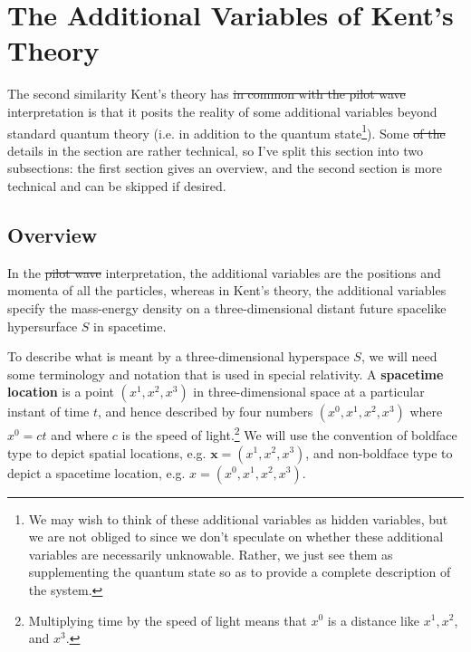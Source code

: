 \documentclass[12pt]{report}
\providecommand{\DIFadd}[1]{{\protect\color{blue}\uwave{#1}}} %
\providecommand{\DIFdel}[1]{{\protect\color{red}\sout{#1}}}                      %
\providecommand{\DIFaddbegin}{} %
\providecommand{\DIFaddend}{} %
\providecommand{\DIFdelbegin}{} %
\providecommand{\DIFdelend}{} %
\begin{document}

\section{The Additional Variables of Kent's Theory\label{additional}}
The second similarity Kent's theory has \DIFdelbegin \DIFdel{in common with the pilot wave }\DIFdelend \DIFaddbegin \DIFadd{with the Bohmian }\DIFaddend interpretation is that it posits the reality of some additional variables beyond standard quantum theory (i.e. in addition to the quantum state\footnote{We may wish to think of these additional variables as hidden variables, but we are not obliged to since we don't speculate on whether these additional variables are necessarily unknowable. Rather, we just see them as supplementing the quantum state so as to provide a complete description of the system.}). Some \DIFdelbegin \DIFdel{of the }\DIFdelend details in the section are rather technical, so I've split this section into two subsections: the first section gives an overview, and the second section is more technical and can be skipped if desired. 
\subsection{Overview\DIFaddbegin \label{additionalOverview}\DIFaddend }
In the \DIFdelbegin \DIFdel{pilot wave }\DIFdelend \DIFaddbegin \DIFadd{Bohmian }\DIFaddend interpretation, the additional variables are the positions and momenta of all the particles, whereas in Kent's theory, the additional variables specify the mass-energy density on a three-dimensional distant future spacelike hypersurface $S$  %
%
 in spacetime. 

To describe what is meant by a three-dimensional hyperspace $S$, we will need some terminology and notation that is used in special relativity. A \textbf{spacetime location}\label{spacetimedef} is a point $(x^1,x^2,x^3)$ in three-dimensional space at a particular instant of time $t$, and hence described by four numbers $(x^0,x^1,x^2,x^3)$  %
%
where $x^0=c t$  %
%
 and where $c$ is the speed of light.\footnote{Multiplying time by the speed of light means that $x^0$ is a distance like $x^1,x^2$, and $x^3$. } We will use the convention of boldface type to depict spatial locations, e.g. $\bm{x}=(x^1,x^2,x^3)$,  %
  and non-boldface type to depict a spacetime location, e.g. $x=(x^0,x^1,x^2,x^3)$.  %
\end{document}

